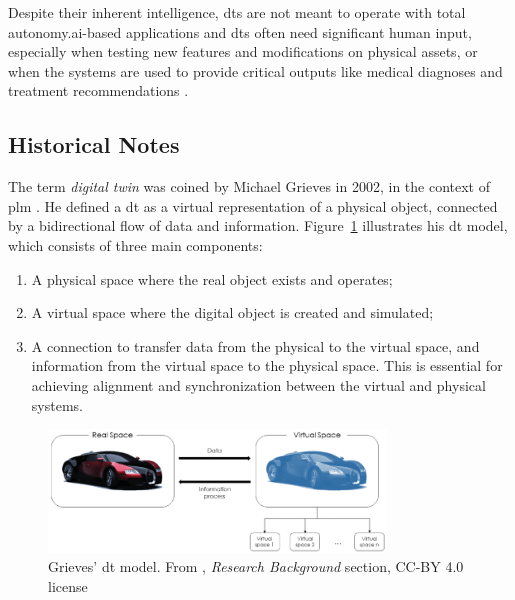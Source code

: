 Despite their inherent intelligence, \acrshort{dt}s are not meant to operate with total autonomy.\@ \acrshort{ai}-based applications and \acrshort{dt}s often need significant human input, especially when testing new features and modifications on physical assets, or when the systems are used to provide critical outputs like medical diagnoses and treatment recommendations \parencite{barricelliSurveyDigitalTwin2019}.

\subsection{Historical Notes}

The term \textit{digital twin} was coined by Michael Grieves in 2002, in the context of \acrfull{plm} \parencite{grievesDigitalTwinManufacturing2014,grievesDigitalTwinMitigating2017}. He defined a \acrshort{dt} as a virtual representation of a physical object, connected by a bidirectional flow of data and information. Figure~\ref{fig:grieves_digital_twin} illustrates his \acrshort{dt} model, which consists of three main components:
\begin{enumerate}
    \item A physical space where the real object exists and operates;
    \item A virtual space where the digital object is created and simulated;
    \item A connection to transfer data from the physical to the virtual space, and information from the virtual space to the physical space. This is essential for achieving alignment and synchronization between the virtual and physical systems.
\end{enumerate}

\begin{figure}
    \centering
    \includegraphics[width=0.8\textwidth]{images/digital_twins/dt_model_grieves.png}
    \caption[Grieves' \acrshort{dt} model]{Grieves' \acrshort{dt} model. From \textcite{barricelliSurveyDigitalTwin2019}, \textit{Research Background} section, CC-BY 4.0 license}%
    \label{fig:grieves_digital_twin}
\end{figure}

